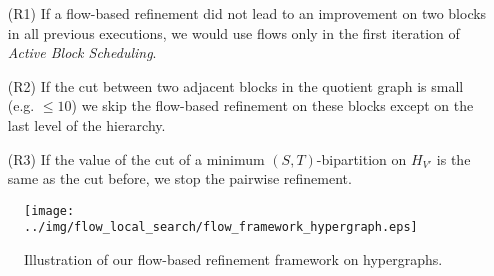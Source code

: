 \begin{enumerate}
\item[(R1)] If a flow-based refinement did not lead to an improvement on two blocks in all previous
            executions, we would use flows only in the first iteration of 
            \emph{Active Block Scheduling}.
\item[(R2)] If the cut between two adjacent blocks in the quotient graph is small (e.g. $\le 10$) we
            skip the flow-based refinement on these blocks except on the last level of the hierarchy.
\item[(R3)] If the value of the cut of a minimum $(S,T)$-bipartition on $H_{V'}$ is the same 
            as the cut before, we stop the pairwise refinement.
\end{enumerate}

\begin{figure}
\centering 
\texttt{[image: ../img/flow\_local\_search/flow\_framework\_hypergraph.eps]}
\caption{Illustration of our flow-based refinement framework on hypergraphs.}
\label{img:flow_framework}
\end{figure} 
